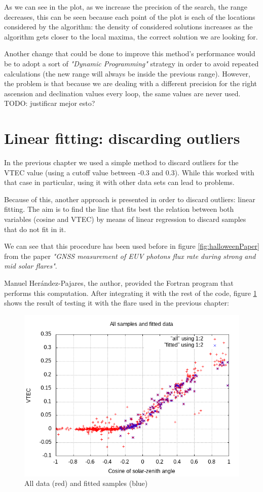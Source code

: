 As we can see in the plot, as we increase the precision of the search, the range decreases, this can be seen because each point
of the plot is each of the locations considered by the algorithm: the density of considered solutions increases as the algorithm gets closer to the local maxima,
the correct solution we are looking for.

Another change that could be done to improve this method's performance would be to adopt a sort of \textit{"Dynamic Programming"} strategy in order to avoid repeated calculations (the new range will always be inside the previous range). However, the problem is that because we are dealing with a different precision for the right ascension and declination values every loop, the same values are never used. TODO: justificar mejor esto? \\

\section{Linear fitting: discarding outliers}

In the previous chapter we used a simple method to discard outliers for the VTEC value (using a cutoff value between -0.3 and 0.3). While this worked with that case in particular, using it with other data sets can lead to problems.

Because of this, another approach is presented in order to discard outliers: linear fitting. The aim is to find the line that fits best the relation between both variables (cosine and VTEC) by means of linear regression to discard samples that do not fit in it.

We can see that this procedure has been used before in figure \ref{fig:halloweenPaper} from the paper \textit{"GNSS measurement of EUV photons flux rate during strong and mid solar flares"}\cite{hernandez2012gnss}.

Manuel Herández-Pajares, the author, provided the Fortran program that performs this computation. After integrating it with the rest of the code, figure \ref{fig:linearFit} shows the result of testing it with the flare used in the previous chapter:

\begin{figure}[!htb]
	\begin{centering}
	\includegraphics[width=0.5\linewidth]{images/ch6/linearFit/resultAll.png}
		\caption{All data (red) and fitted samples (blue)}
		\label{fig:linearFit}
	\end{centering}
\end{figure}

